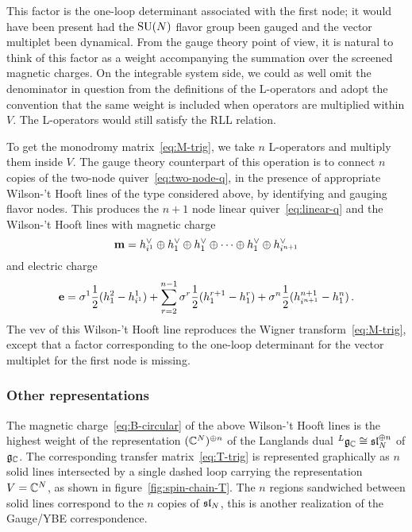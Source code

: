 This factor is the one-loop determinant associated with the first
node; it would have been present had the $\mathrm{SU}(N)$ flavor group been
gauged and the vector multiplet been dynamical.  From the gauge theory
point of view, it is natural to think of this factor as a weight
accompanying the summation over the screened magnetic charges.  On the
integrable system side, we could as well omit the denominator in
question from the definitions of the L-operators and adopt the
convention that the same weight is included when operators are
multiplied within $V$.  The L-operators would still satisfy the RLL
relation.

To get the monodromy matrix~\eqref{eq:M-trig}, we take $n$ L-operators
and multiply them inside $V$.  The gauge theory counterpart of this
operation is to connect $n$ copies of the two-node
quiver~\eqref{eq:two-node-q}, in the presence of appropriate
Wilson-'t Hooft lines of the type considered above, by identifying
and gauging flavor nodes.  This produces the $n+1$ node linear
quiver~\eqref{eq:linear-q} and the Wilson-'t Hooft lines with
magnetic charge
\begin{equation}
  \label{eq:B-linear}
  \mathbf{m}
  =
  h^\vee_{i^1} \oplus h^\vee_1 \oplus h^\vee_1 \oplus \dotsb \oplus h^\vee_1
  \oplus h^\vee_{i^{n+1}}
\end{equation}
and electric charge
\begin{equation}
  \mathbf{e}
  =
  \sigma^1 \frac12 (h_1^2 - h_{i^1}^1)
  + \sum_{r=2}^{n-1} \sigma^r \frac12 (h^{r+1}_1 - h^r_1)
  + \sigma^n \frac12 (h_{i^{n+1}}^{n+1} - h_1^n) \,.
\end{equation}
The vev of this Wilson-'t Hooft line reproduces the Wigner
transform~\eqref{eq:M-trig}, except that a factor corresponding to the
one-loop determinant for the vector multiplet for the first node is
missing.







\subsubsection{Other representations}

The magnetic charge~\eqref{eq:B-circular} of the above Wilson-'t
Hooft lines is the highest weight of the representation
$(\mathbb{C}^N)^{\oplus n}$ of the Langlands dual
${}^L\mathfrak{g}_{\mathbb{C}} \cong \mathfrak{sl}_N^{\oplus n}$ of $\mathfrak{g}_{\mathbb{C}}$.  The corresponding
transfer matrix~\eqref{eq:T-trig} is represented graphically as $n$
solid lines intersected by a single dashed loop carrying the
representation $V = \mathbb{C}^N$, as shown in figure~\ref{fig:spin-chain-T}.
The $n$ regions sandwiched between solid lines correspond to the $n$
copies of $\mathfrak{sl}_N$, this is another realization of the
Gauge/YBE correspondence.

